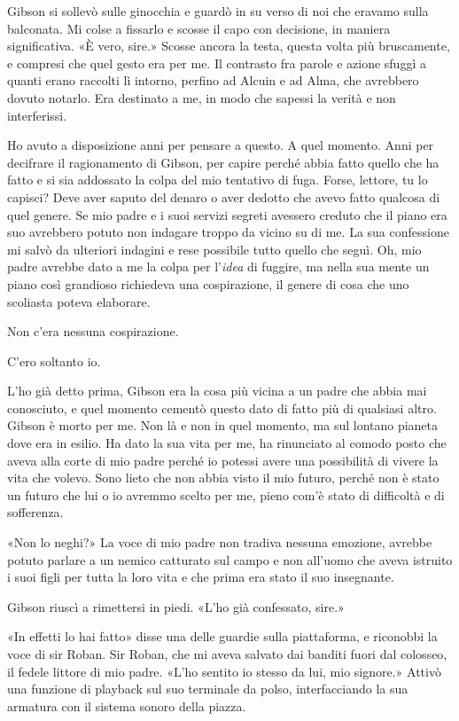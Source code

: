 Gibson si sollevò sulle ginocchia e guardò in su verso di noi che
eravamo sulla balconata. Mi colse a fissarlo e scosse il capo con
decisione, in maniera significativa. «È vero, sire.» Scosse ancora la
testa, questa volta più bruscamente, e compresi che quel gesto era per
me. Il contrasto fra parole e azione sfuggì a quanti erano raccolti lì
intorno, perfino ad Alcuin e ad Alma, che avrebbero dovuto notarlo. Era
destinato a me, in modo che sapessi la verità e non interferissi.

Ho avuto a disposizione anni per pensare a questo. A quel momento. Anni
per decifrare il ragionamento di Gibson, per capire perché abbia fatto
quello che ha fatto e si sia addossato la colpa del mio tentativo di
fuga. Forse, lettore, tu lo capisci? Deve aver saputo del denaro o aver
dedotto che avevo fatto qualcosa di quel genere. Se mio padre e i suoi
servizi segreti avessero creduto che il piano era suo avrebbero potuto
non indagare troppo da vicino su di me. La sua confessione mi salvò da
ulteriori indagini e rese possibile tutto quello che seguì. Oh, mio
padre avrebbe dato a me \emph{} la colpa per l'\emph{idea} di fuggire,
ma nella sua mente un piano così grandioso richiedeva una cospirazione,
il genere di cosa che uno scoliasta poteva elaborare.

Non c'era nessuna cospirazione.

C'ero soltanto io.

L'ho già detto prima, Gibson era la cosa più vicina a un padre che abbia
mai conosciuto, e quel momento cementò questo dato di fatto più di
qualsiasi altro. Gibson è morto per me. Non là e non in quel momento, ma
sul lontano pianeta dove era in esilio. Ha dato la sua vita per me, ha
rinunciato al comodo posto che aveva alla corte di mio padre perché io
potessi avere una possibilità di vivere la vita che volevo. Sono lieto
che non abbia visto il mio futuro, perché non è stato un futuro che lui
o io avremmo scelto per me, pieno com'è stato di difficoltà e di
sofferenza.

«Non lo neghi?» La voce di mio padre non tradiva nessuna emozione,
avrebbe potuto parlare a un nemico catturato sul campo e non all'uomo
che aveva istruito i suoi figli per tutta la loro vita e che prima era
stato il suo insegnante.

Gibson riuscì a rimettersi in piedi. «L'ho già confessato, sire.»

«In effetti lo hai fatto» disse una delle guardie sulla piattaforma, e
riconobbi la voce di sir Roban. Sir Roban, che mi aveva salvato dai
banditi fuori dal colosseo, il fedele littore di mio padre. «L'ho
sentito io stesso da lui, mio signore.» Attivò una funzione di playback
sul suo terminale da polso, interfacciando la sua armatura con il
sistema sonoro della piazza.

